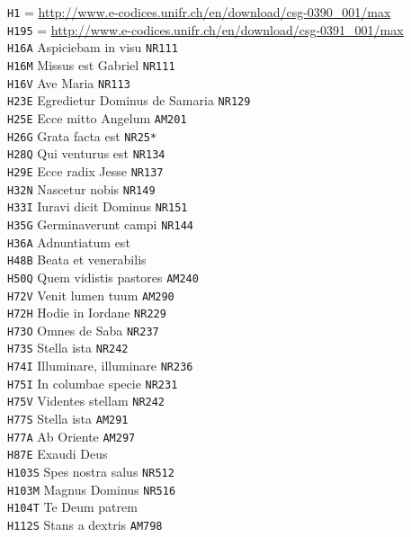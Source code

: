 \documentclass[a4paper]{article}
\begin{document}
{\begin{multicols}{2}
\noindent
\texttt{H1} = \url{http://www.e-codices.unifr.ch/en/download/csg-0390_001/max}\\
\texttt{H195} = \url{http://www.e-codices.unifr.ch/en/download/csg-0391_001/max}\\
\texttt{H16A} Aspiciebam in visu \texttt{NR111}\\
\texttt{H16M} Missus est Gabriel \texttt{NR111}\\
\texttt{H16V} Ave Maria \texttt{NR113}\\
\texttt{H23E} Egredietur Dominus de Samaria \texttt{NR129}\\
\texttt{H25E} Ecce mitto Angelum \texttt{AM201}\\
\texttt{H26G} Grata facta est \texttt{NR25*}\\
\texttt{H28Q} Qui venturus est \texttt{NR134}\\
\texttt{H29E} Ecce radix Jesse \texttt{NR137}\\
\texttt{H32N} Nascetur nobis \texttt{NR149}\\
\texttt{H33I} Iuravi dicit Dominus \texttt{NR151}\\
\texttt{H35G} Germinaverunt campi \texttt{NR144}\\
\texttt{H36A} Adnuntiatum est\\
\texttt{H48B} Beata et venerabilis\\
\texttt{H50Q} Quem vidistis pastores \texttt{AM240}\\
\texttt{H72V} Venit lumen tuum \texttt{AM290}\\
\texttt{H72H} Hodie in Iordane \texttt{NR229}\\
\texttt{H73O} Omnes de Saba \texttt{NR237}\\
\texttt{H73S} Stella ista \texttt{NR242}\\
\texttt{H74I} Illuminare, illuminare \texttt{NR236}\\
\texttt{H75I} In columbae specie \texttt{NR231}\\
\texttt{H75V} Videntes stellam \texttt{NR242}\\
\texttt{H77S} Stella ista \texttt{AM291}\\
\texttt{H77A} Ab Oriente \texttt{AM297}\\
\texttt{H87E} Exaudi Deus\\
\texttt{H103S} Spes nostra salus \texttt{NR512}\\
\texttt{H103M} Magnus Dominus \texttt{NR516}\\
\texttt{H104T} Te Deum patrem\\
\texttt{H112S} Stans a dextris \texttt{AM798}\\

\end{multicols}}
\end{document}
